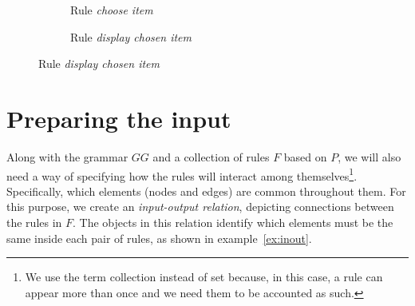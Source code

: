 \begin{example}
\begin{figure}[!]
\ContinuedFloat
\centering
  \begin{subfigure}[t]{.5\textwidth}
    \centerline{}
    \caption{Rule \emph{choose item}}
  \end{subfigure}

  \begin{subfigure}[t]{.5\textwidth}
    \centerline{}
    \caption{Rule \emph{display chosen item}}
  \end{subfigure}
\end{figure}
\end{example}


\section{Preparing the input}

Along with the grammar $GG$ and a collection of rules $F$ based on $P$, we will also need a way of specifying how the rules will interact among themselves\footnote{ We use the term collection instead of set because, in this case, a rule can appear more than once and we need them to be accounted as such.}. Specifically, which elements (nodes and edges) are common throughout them. For this purpose, we create an \emph{input-output relation}, depicting connections between the rules in $F$. The objects in this relation identify which elements must be the same inside each pair of rules, as shown in example~\ref{ex:inout}.

